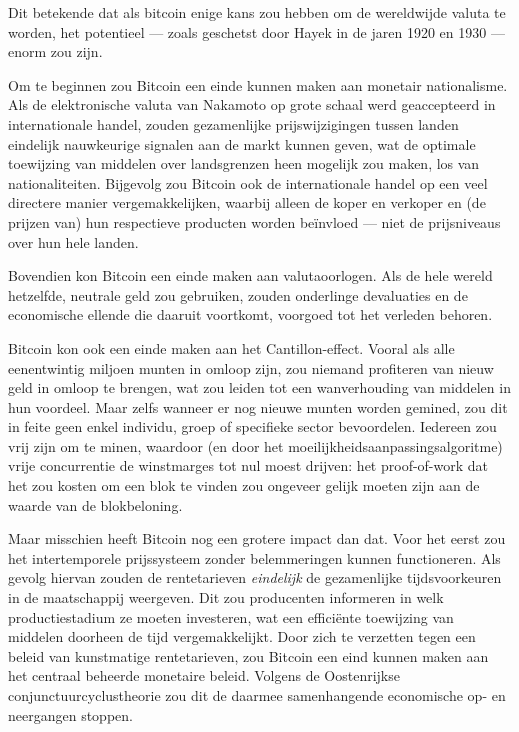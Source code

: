 \documentclass[
  a5paper,
  smalldemyvopaper,11pt,twoside,onecolumn,openright,extrafontsizes,
hidelinks]{memoir}
\begin{document}
Dit betekende dat als bitcoin enige kans zou hebben om de wereldwijde
valuta te worden, het potentieel --- zoals geschetst door Hayek in de
jaren 1920 en 1930 --- enorm zou zijn.

Om te beginnen zou Bitcoin een einde kunnen maken aan monetair
nationalisme. Als de elektronische valuta van Nakamoto op grote schaal
werd geaccepteerd in internationale handel, zouden gezamenlijke
prijswijzigingen tussen landen eindelijk nauwkeurige signalen aan de
markt kunnen geven, wat de optimale toewijzing van middelen over
landsgrenzen heen mogelijk zou maken, los van nationaliteiten. Bijgevolg
zou Bitcoin ook de internationale handel op een veel directere manier
vergemakkelijken, waarbij alleen de koper en verkoper en (de prijzen
van) hun respectieve producten worden beïnvloed --- niet de prijsniveaus
over hun hele landen.

Bovendien kon Bitcoin een einde maken aan valutaoorlogen. Als de hele
wereld hetzelfde, neutrale geld zou gebruiken, zouden onderlinge
devaluaties en de economische ellende die daaruit voortkomt, voorgoed
tot het verleden behoren.

Bitcoin kon ook een einde maken aan het Cantillon-effect. Vooral als
alle eenentwintig miljoen munten in omloop zijn, zou niemand profiteren
van nieuw geld in omloop te brengen, wat zou leiden tot een
wanverhouding van middelen in hun voordeel. Maar zelfs wanneer er nog
nieuwe munten worden gemined, zou dit in feite geen enkel individu,
groep of specifieke sector bevoordelen. Iedereen zou vrij zijn om te
minen, waardoor (en door het moeilijkheidsaanpassingsalgoritme) vrije
concurrentie de winstmarges tot nul moest drijven: het proof-of-work dat
het zou kosten om een blok te vinden zou ongeveer gelijk moeten zijn aan
de waarde van de blokbeloning.

Maar misschien heeft Bitcoin nog een grotere impact dan dat. Voor het
eerst zou het intertemporele prijssysteem zonder belemmeringen kunnen
functioneren. Als gevolg hiervan zouden de rentetarieven
\emph{eindelijk} de gezamenlijke tijdsvoorkeuren in de maatschappij
weergeven. Dit zou producenten informeren in welk productiestadium ze
moeten investeren, wat een efficiënte toewijzing van middelen doorheen
de tijd vergemakkelijkt. Door zich te verzetten tegen een beleid van
kunstmatige rentetarieven, zou Bitcoin een eind kunnen maken aan het
centraal beheerde monetaire beleid. Volgens de Oostenrijkse
conjunctuurcyclustheorie zou dit de daarmee samenhangende economische
op- en neergangen stoppen.
\end{document}
